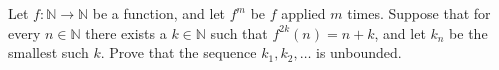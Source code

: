 Let $f : \mathbb{N} \to \mathbb{N}$ be a function, and let $f^m$ be $f$ applied $m$ times. Suppose that for every $n \in \mathbb{N}$ there exists a $k \in \mathbb{N}$ such that $f^{2k}(n) = n + k$, and let $k_n$ be the smallest such $k$. Prove that the sequence $k_1, k_2, \ldots$ is unbounded.
